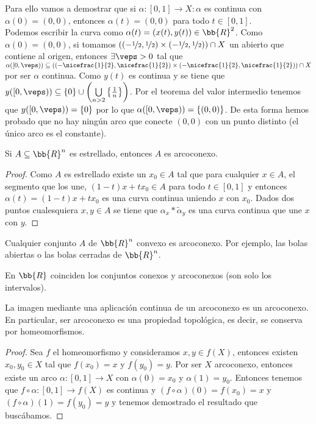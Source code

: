 \begin{ejemplo}
    Para ello vamos a demostrar que si $\alpha:[0,1]\to X : \alpha$ es continua con $\alpha(0)=(0,0)$, entonces $\alpha(t)=(0,0)$ para todo $t\in [0,1]$.\\

    Podemos escribir la curva como $\alpha(t) = (x(t), y(t))\in \bb{R}^2$. Como $\alpha(0)=(0,0)$, si tomamos $((-\nicefrac{1}{2}, \nicefrac{1}{2})\times (-\nicefrac{1}{2}, \nicefrac{1}{2})) \cap X$ un abierto que contiene al origen, entonces $\exists \veps > 0$ tal que $\alpha([0,\veps))\subseteq ((-\nicefrac{1}{2}, \nicefrac{1}{2})\times (-\nicefrac{1}{2}, \nicefrac{1}{2})) \cap X$ por ser $\alpha$ continua. Como $y(t)$ es continua y se tiene que $y([0,\veps))\subseteq \{0\}\cup\left(\bigcup\limits_{n>2} \left\{\frac{1}{n}\right\}\right)$. Por el teorema del valor intermedio tenemos que $y([0,\veps)) = \{0\}$ por lo que $\alpha([0,\veps))=\{(0,0)\}$. De esta forma hemos probado que no hay ningún arco que conecte $(0,0)$ con un punto distinto (el único arco es el constante).
\end{ejemplo}

\begin{teo}
    Si $A\subseteq \bb{R}^n$ es estrellado, entonces $A$ es arcoconexo.
    \begin{proof}
        Como $A$ es estrellado existe un $x_0\in A$ tal que para cualquier $x\in A$, el segmento que los une, $(1-t)x + tx_0\in A$ para todo $t\in [0,1]$ y entonces $\alpha(t)=(1-t)x+tx_0$ es una curva continua uniendo $x$ con $x_0$. Dados dos puntos cualesquiera $x,y \in A$ se tiene que $\alpha_x\ast \tilde{\alpha}_y$ es una curva continua que une $x$ con $y$.
    \end{proof}
\end{teo}

\begin{coro}
    Cualquier conjunto $A$ de $\bb{R}^n$ convexo es arcoconexo. Por ejemplo, las bolas abiertas o las bolas cerradas de $\bb{R}^n$.
\end{coro}

\begin{coro}
    En $\bb{R}$ coinciden los conjuntos conexos y arcoconexos (son solo los intervalos).
\end{coro}

\begin{teo}
    La imagen mediante una aplicación continua de un arcoconexo es un arcoconexo. En particular, ser arcoconexo es una propiedad topológica, es decir, se conserva por homeomorfismos.
    \begin{proof}
        Sea $f$ el homeomorfismo y consideramos $x,y\in f(X)$, entonces existen $x_0,y_0\in X$ tal que $f(x_0)=x$ y $f(y_0) = y$. Por ser $X$ arcoconexo, entonces existe un arco $\alpha:[0,1]\to X$ con $\alpha(0)=x_0$ y $\alpha(1)=y_0$. Entonces tenemos que $f\circ \alpha: [0,1]\to f(X)$ es continua y $(f\circ \alpha)(0) = f(x_0) = x$ y $(f\circ\alpha)(1) = f(y_0) = y$ y tenemos demostrado el resultado que buscábamos.
    \end{proof}
\end{teo}

